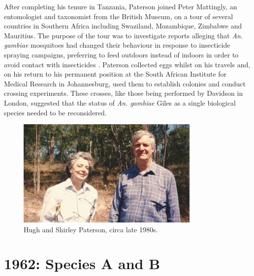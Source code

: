 \documentclass[a4paper,11pt,abstracton,hidelinks]{scrartcl}
\begin{document}
After completing his tenure in Tanzania, Paterson joined Peter Mattingly, an entomologist and taxonomist from the British Museum, on a tour of several countries in Southern Africa including Swaziland, Mozambique, Zimbabwe and Mauritius.
%
The purpose of the tour was to investigate reports alleging that \textit{An. gambiae} mosquitoes had changed their behaviour in response to insecticide spraying campaigns, preferring to feed outdoors instead of indoors in order to avoid contact with insecticides \citep{Mattingly1963}.
%
Paterson collected eggs whilst on his travels and, on his return to his permanent position at the South African Institute for Medical Research in Johannesburg, used them to establish colonies and conduct crossing experiments.
%
These crosses, like those being performed by Davidson in London, suggested that the status of \textit{An. gambiae} Giles as a single biological species needed to be reconsidered.


\begin{figure}[t]
\centering
\includegraphics[width=0.8\textwidth]{artwork/Hugh_and_Shirley_Paterson_Brisbane.jpg}
\caption{Hugh and Shirley Paterson, circa late 1980s.}
\end{figure}


\section{1962: Species A and B}
\end{document}
